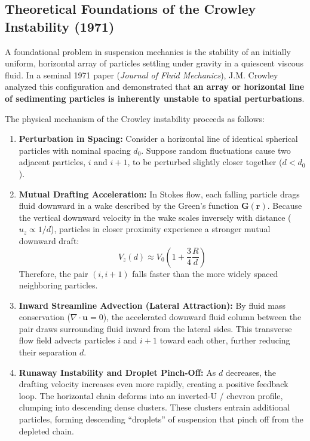 \documentclass[11pt,a4paper]{article}
\begin{document}
\subsection{Theoretical Foundations of the Crowley Instability (1971)}
A foundational problem in suspension mechanics is the stability of an initially uniform, horizontal array of particles settling under gravity in a quiescent viscous fluid. In a seminal 1971 paper (\emph{Journal of Fluid Mechanics}), J.M. Crowley analyzed this configuration and demonstrated that \textbf{an array or horizontal line of sedimenting particles is inherently unstable to spatial perturbations}.

The physical mechanism of the Crowley instability proceeds as follows:
\begin{enumerate}
    \item \textbf{Perturbation in Spacing:} Consider a horizontal line of identical spherical particles with nominal spacing $d_0$. Suppose random fluctuations cause two adjacent particles, $i$ and $i+1$, to be perturbed slightly closer together ($d < d_0$).
    \item \textbf{Mutual Drafting Acceleration:} In Stokes flow, each falling particle drags fluid downward in a wake described by the Green's function $\mathbf{G}(\mathbf{r})$. Because the vertical downward velocity in the wake scales inversely with distance ($u_z \propto 1/d$), particles in closer proximity experience a stronger mutual downward draft:
    \begin{equation}
        V_z(d) \approx V_0 \left( 1 + \frac{3}{4}\frac{R}{d} \right)
    \end{equation}
    Therefore, the pair $(i, i+1)$ falls faster than the more widely spaced neighboring particles.
    \item \textbf{Inward Streamline Advection (Lateral Attraction):} By fluid mass conservation ($\nabla \cdot \mathbf{u} = 0$), the accelerated downward fluid column between the pair draws surrounding fluid inward from the lateral sides. This transverse flow field advects particles $i$ and $i+1$ toward each other, further reducing their separation $d$.
    \item \textbf{Runaway Instability and Droplet Pinch-Off:} As $d$ decreases, the drafting velocity increases even more rapidly, creating a positive feedback loop. The horizontal chain deforms into an inverted-U / chevron profile, clumping into descending dense clusters. These clusters entrain additional particles, forming descending ``droplets'' of suspension that pinch off from the depleted chain.
\end{enumerate}
\end{document}
